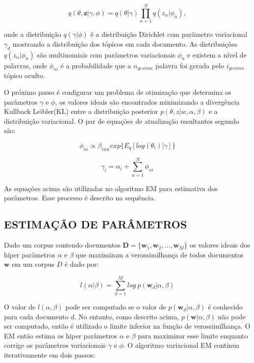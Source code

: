 \documentclass[12pt,a4paper]{article}
\begin{document}
  \begin{equation}
  q(\theta,\textbf{z}|\gamma,\phi)=q(\theta|\gamma)\prod_{n=1}^{N}q(z_n|\phi_n), 
  \end{equation}
  
  onde a distribuição  $q(\gamma|\phi)$ é a distribuição Dirichlet com parâmetro variacional $\gamma_d$ mostrando a distribuição dos tópicos em cada documento.
   As distribuições $q(z_n | \phi_n)$ são multinomiais com parâmetros variacionais $\phi_n$ e existem a nível de palavras, onde $\phi_{ni}$ é a probabilidade que a $n_{gesima}$ palavra foi gerada pelo $i_{gesimo}$ tópico oculto.
  
  O próximo passo é configurar um problema de otimização que determina os parâmetros $\gamma$ e $\phi$,
   os valores ideais são encontrados minimizando a divergência Kullback Leibler(KL) entre a distribuição posterior $p(\theta, z|w,\alpha,\beta)$ e a distribuição variacional.
   O par de equações de atualização resultantes segundo  são:
  
  \begin{equation}
  \phi_{ni} \propto \beta_{iwn} exp\{E_q[log(\theta_i)|\gamma]\}
  \end{equation}
  
  \begin{equation}
  \gamma_i = \alpha_i + \sum_{n=1}^{N} \phi_{ni}
  \end{equation}
  
  As equações acima são utilizadas no algoritmo EM para estimativa dos parâmetros. Esse processo é descrito na sequência.
  
  \subsection{ESTIMAÇÃO DE PARÂMETROS}
  Dado um corpus contendo documentos $\textbf{D} = \{\textbf{w}_1, \textbf{w}_2, . . ., \textbf{w}_M\}$ os valores ideais dos hiper parâmetros $\alpha$ e $\beta$
   que maximizam a verossimilhança de todos documentos $\textbf{w}$ em um corpus $D$ é dado por:
  
  \begin{equation}
  l(\alpha|\beta) = \sum_{d=1}^{M} log\ p(\textbf{w}_d|\alpha,\beta)
  \end{equation}
  
  O valor de $l(\alpha, \beta)$ pode ser computado se o valor de $p(\textbf{w}_d|\alpha, \beta)$ é conhecido para cada documento $d$. No entanto,
   como descrito acima, $p(\textbf{w}|\alpha,\beta)$ não pode ser computado, então é utilizado o limite inferior na função de verossimilhança.
   O EM então estima os hiper parâmetros $\alpha$ e $\beta$ para maximizar esse limite enquanto corrige os parâmetros variacionais $\gamma$ e $\phi$. 
   O algoritmo variacional EM continua iterativamente em dois passos:
  
\end{document}
